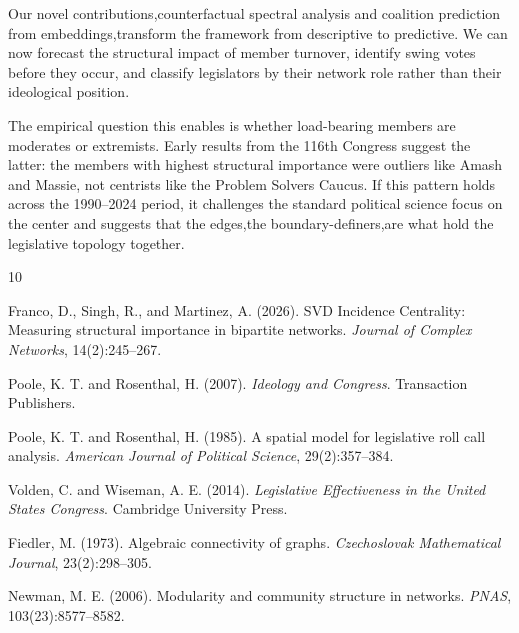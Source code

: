 \documentclass[11pt,a4paper]{article}
\begin{document}
Our novel contributions,counterfactual spectral analysis and coalition prediction from embeddings,transform the framework from descriptive to predictive. We can now forecast the structural impact of member turnover, identify swing votes before they occur, and classify legislators by their network role rather than their ideological position.

The empirical question this enables is whether load-bearing members are moderates or extremists. Early results from the 116th Congress suggest the latter: the members with highest structural importance were outliers like Amash and Massie, not centrists like the Problem Solvers Caucus. If this pattern holds across the 1990--2024 period, it challenges the standard political science focus on the center and suggests that the edges,the boundary-definers,are what hold the legislative topology together.


\begin{thebibliography}{10}

Franco, D., Singh, R., and Martinez, A. (2026).
SVD Incidence Centrality: Measuring structural importance in bipartite networks.
\textit{Journal of Complex Networks}, 14(2):245--267.

Poole, K. T. and Rosenthal, H. (2007).
\textit{Ideology and Congress}.
Transaction Publishers.

Poole, K. T. and Rosenthal, H. (1985).
A spatial model for legislative roll call analysis.
\textit{American Journal of Political Science}, 29(2):357--384.

Volden, C. and Wiseman, A. E. (2014).
\textit{Legislative Effectiveness in the United States Congress}.
Cambridge University Press.

Fiedler, M. (1973).
Algebraic connectivity of graphs.
\textit{Czechoslovak Mathematical Journal}, 23(2):298--305.

Newman, M. E. (2006).
Modularity and community structure in networks.
\textit{PNAS}, 103(23):8577--8582.

\end{thebibliography}
\end{document}
